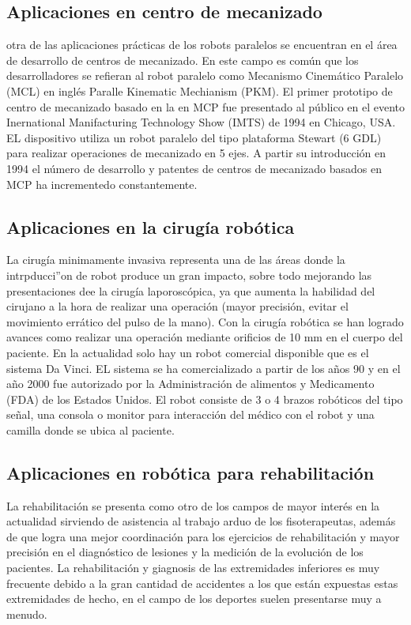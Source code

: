 \documentclass[letter,openrigh,12pt,spanish]{report}
\begin{document}
\subsection{Aplicaciones en centro de mecanizado}

otra de las aplicaciones pr\'acticas de los robots paralelos se encuentran en el \'area de desarrollo de centros de mecanizado. En este campo es com\'un que los desarrolladores se refieran al robot paralelo como Mecanismo Cinem\'atico Paralelo (MCL) en ingl\'es Paralle Kinematic Mechianism (PKM). El primer prototipo de centro de mecanizado basado en la en MCP fue presentado al p\'ublico en el evento Inernational Manifacturing Technology Show (IMTS) de 1994 en Chicago, USA. EL dispositivo utiliza un robot paralelo del tipo plataforma Stewart (6 GDL) para realizar operaciones de mecanizado en 5 ejes. A partir su introducci\'on en 1994 el n\'umero de desarrollo y patentes de centros de mecanizado basados en MCP ha incrementedo constantemente.

\subsection{Aplicaciones en la cirug\'ia rob\'otica}

La cirug\'ia minimamente invasiva representa una de las \'areas donde la intrpducci''on de robot produce un gran impacto, sobre todo mejorando las presentaciones dee la cirug\'ia laporosc\'opica, ya que aumenta la habilidad del cirujano a la hora de realizar una operaci\'on (mayor precisi\'on, evitar el movimiento err\'atico del pulso de la mano). Con la cirug\'ia rob\'otica se han logrado avances como realizar una operaci\'on mediante orificios de 10 mm en el cuerpo del paciente. En la actualidad solo hay un robot comercial disponible que es el sistema Da Vinci. EL sistema se ha comercializado a partir de los a\~nos 90 y en el a\~no 2000 fue autorizado por la Administraci\'on de alimentos y Medicamento (FDA) de los Estados Unidos. El robot consiste de 3 o 4 brazos rob\'oticos del tipo se\~nal, una consola o monitor para interacci\'on del m\'edico con el robot y una camilla donde se ubica al paciente.

\subsection{Aplicaciones en rob\'otica para rehabilitaci\'on}

La rehabilitaci\'on se presenta como otro de los campos de mayor inter\'es en la actualidad sirviendo de asistencia al trabajo arduo de los fisoterapeutas, adem\'as de que logra una mejor coordinaci\'on para los ejercicios de rehabilitaci\'on y mayor precisi\'on en el diagn\'ostico de lesiones y la medici\'on de la evoluci\'on de los pacientes. La rehabilitaci\'on y giagnosis de las extremidades inferiores es muy frecuente debido a la gran cantidad de accidentes a los que est\'an expuestas estas extremidades de hecho, en el campo de los deportes suelen presentarse muy a menudo.
\end{document}
